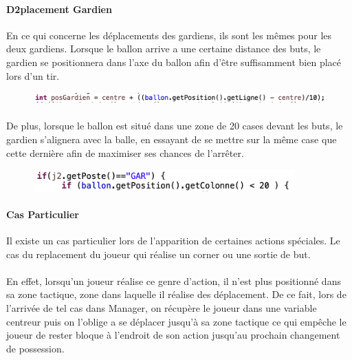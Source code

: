 \paragraph{D2placement Gardien}
       En ce qui concerne les déplacements des gardiens, ils sont les mêmes pour les deux gardiens. Lorsque le ballon arrive a une certaine distance des buts, le gardien se positionnera dans l'axe du ballon afin d'être suffisamment bien placé lors d'un tir.

\begin{figure}[h]
\centering
\includegraphics[width=15cm]{images/code_posgardien.png}
\label{fig:posGardien}
\end{figure}

\paragraph{}
   De plus, lorsque le ballon est situé dans une zone de 20 cases devant les buts, le gardien s'alignera avec la balle, en essayant de se mettre sur la même case que cette dernière afin de maximiser ses chances de l'arrêter.
\begin{figure}[h]
\centering
\includegraphics[width=10cm]{images/code_gardien.png}
\label{fig:gardien}
\end{figure}

\paragraph{Cas Particulier}
    Il existe un cas particulier lors de l'apparition de certaines actions spéciales. Le  cas du replacement du joueur qui réalise un corner ou une sortie de but.

\paragraph{}
    En effet, lorsqu'un joueur réalise ce genre d'action, il n'est plus positionné dans sa zone tactique, zone dans laquelle il réalise des déplacement. De ce fait, lors de l'arrivée de tel cas dans Manager, on récupère le joueur dans une variable centreur puis on l'oblige a se déplacer jusqu'à sa zone tactique ce qui empêche le joueur de rester bloque à l'endroit de son action jusqu'au prochain changement de possession.
    

